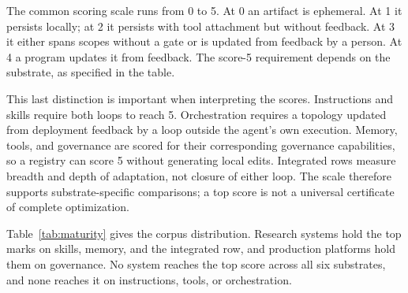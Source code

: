 The common scoring scale runs from 0 to 5. At 0 an artifact is ephemeral. At 1 it persists locally; at 2 it persists with tool attachment but without feedback. At 3 it either spans scopes without a gate or is updated from feedback by a person. At 4 a program updates it from feedback. The score-5 requirement depends on the substrate, as specified in the table.

This last distinction is important when interpreting the scores. Instructions and skills require both loops to reach 5. Orchestration requires a topology updated from deployment feedback by a loop outside the agent's own execution. Memory, tools, and governance are scored for their corresponding governance capabilities, so a registry can score 5 without generating local edits. Integrated rows measure breadth and depth of adaptation, not closure of either loop. The scale therefore supports substrate-specific comparisons; a top score is not a universal certificate of complete optimization.

Table~\ref{tab:maturity} gives the corpus distribution. Research systems hold the top marks on skills, memory, and the integrated row, and production platforms hold them on governance. No system reaches the top score across all six substrates, and none reaches it on instructions, tools, or orchestration.


